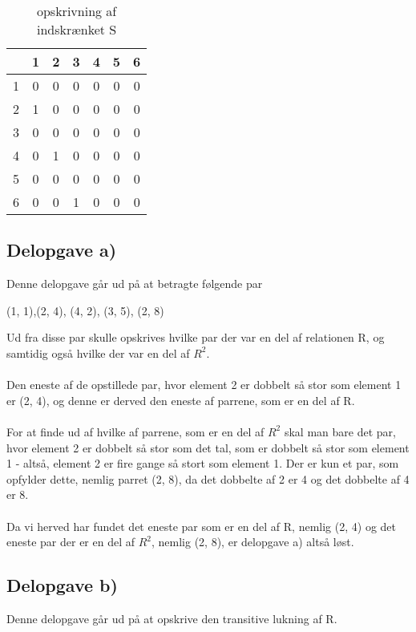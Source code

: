 \documentclass{article}
\begin{document}
\begin{table}[h!]
\centering
    
\begin{tabular}{|c||c|c|c|c|c|c|}
    \hline
     & 1 & 2 & 3 & 4 & 5 & 6 \\
     \hline
    \hline
    1 & 0& 0& 0& 0& 0& 0 \\
    \hline
    2 & 1& 0& 0& 0& 0& 0\\
    \hline
    3 & 0& 0& 0& 0& 0& 0\\
    \hline
    4 & 0& 1& 0& 0& 0& 0\\
    \hline
    5 & 0& 0& 0& 0& 0& 0\\
    \hline
    6 & 0& 0& 1& 0& 0& 0\\
    \hline
    
\end{tabular}
\caption{opskrivning af indskrænket S}
\label{tabel:S}
\end{table}
\subsection{Delopgave a)}
Denne delopgave går ud på at betragte følgende par 
\begin{center}
    (1, 1),(2, 4), (4, 2), (3, 5), (2, 8)
\end{center}
Ud fra disse par skulle opskrives hvilke par der var en del af relationen R, og samtidig også hvilke der var en del af $R^2$. \\ \\

Den eneste af de opstillede par, hvor element 2 er dobbelt så stor som element 1 er (2, 4), og denne er derved den eneste af parrene, som er en del af R. \\ \\

For at finde ud af hvilke af parrene, som er en del af $R^2$ skal man bare det par, hvor element 2 er dobbelt så stor som det tal, som er dobbelt så stor som element 1 - altså, element 2 er fire gange så stort som element 1. Der er kun et par, som opfylder dette, nemlig parret (2, 8), da det dobbelte af 2 er 4 og det dobbelte af 4 er 8. \\ \\

Da vi herved har fundet det eneste par som er en del af R, nemlig (2, 4) og det eneste par der er en del af $R^2$, nemlig (2, 8), er delopgave a) altså løst.

\subsection{Delopgave b)}
Denne delopgave går ud på at opskrive den transitive lukning af R. \\ \\
\end{document}
